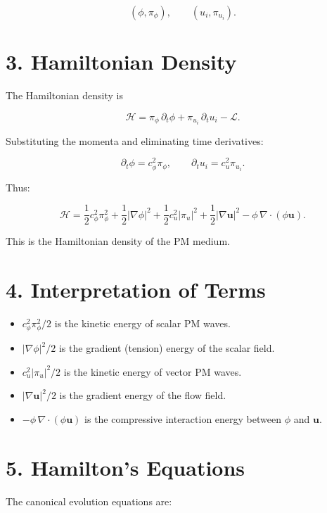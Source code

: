 \documentclass{article}
\begin{document}
\[
(\phi, \pi_\phi), \qquad (u_i, \pi_{u_i}).
\]



\section*{3. Hamiltonian Density}

The Hamiltonian density is


\[
\mathcal{H}
=
\pi_\phi\,\partial_t \phi
+
\pi_{u_i}\,\partial_t u_i
- \mathcal{L}.
\]



Substituting the momenta and eliminating time derivatives:



\[
\partial_t \phi = c_\phi^2 \pi_\phi,
\qquad
\partial_t u_i = c_u^2 \pi_{u_i}.
\]



Thus:


\[
\mathcal{H}
=
\frac{1}{2}c_\phi^2 \pi_\phi^2
+ \frac{1}{2}|\nabla \phi|^2
+
\frac{1}{2}c_u^2 |\pi_{u}|^2
+ \frac{1}{2}|\nabla \mathbf u|^2
- \phi\,\nabla\cdot(\phi\mathbf u).
\]



This is the Hamiltonian density of the PM medium.

\section*{4. Interpretation of Terms}

\begin{itemize}
    \item $c_\phi^2 \pi_\phi^2 / 2$ is the kinetic energy of scalar PM waves.
    \item $|\nabla \phi|^2 / 2$ is the gradient (tension) energy of the scalar field.
    \item $c_u^2 |\pi_u|^2 / 2$ is the kinetic energy of vector PM waves.
    \item $|\nabla \mathbf u|^2 / 2$ is the gradient energy of the flow field.
    \item $-\phi\,\nabla\cdot(\phi\mathbf u)$ is the compressive interaction energy between $\phi$ and $\mathbf u$.
\end{itemize}

\section*{5. Hamilton’s Equations}

The canonical evolution equations are:
\end{document}
